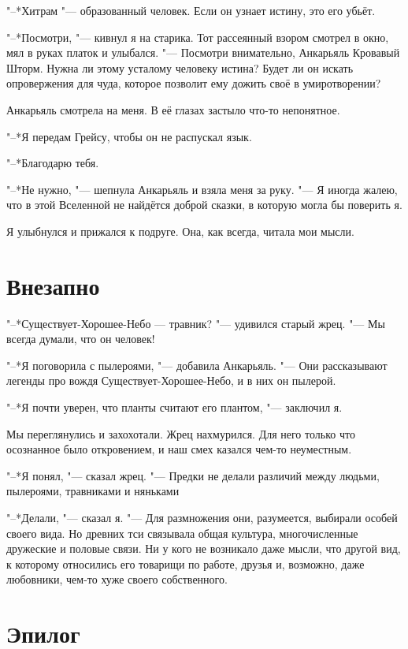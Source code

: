 "--*Хитрам "--- образованный человек.
Если он узнает истину, это его убьёт.

"--*Посмотри, "--- кивнул я на старика.
Тот рассеянный взором смотрел в окно, мял в руках платок и улыбался.
"--- Посмотри внимательно, Анкарьяль Кровавый Шторм.
Нужна ли этому усталому человеку истина?
Будет ли он искать опровержения для чуда, которое позволит ему дожить своё в умиротворении?

Анкарьяль смотрела на меня.
В её глазах застыло что-то непонятное.

"--*Я передам Грейсу, чтобы он не распускал язык.

"--*Благодарю тебя.

"--*Не нужно, "--- шепнула Анкарьяль и взяла меня за руку.
"--- Я иногда жалею, что в этой Вселенной не найдётся доброй сказки, в которую могла бы поверить я.

Я улыбнулся и прижался к подруге.
Она, как всегда, читала мои мысли.

\section{Внезапно}

"--*Существует-Хорошее-Небо — травник? "--- удивился старый жрец.
"--- Мы всегда думали, что он человек!

"--*Я поговорила с пылероями, "--- добавила Анкарьяль.
"--- Они рассказывают легенды про вождя Существует-Хорошее-Небо, и в них он пылерой.

"--*Я почти уверен, что планты считают его плантом, "--- заключил я.

Мы переглянулись и захохотали.
Жрец нахмурился.
Для него только что осознанное было откровением, и наш смех казался чем-то неуместным.

"--*Я понял, "--- сказал жрец.
"--- Предки не делали различий между людьми, пылероями, травниками и няньками\ldotst

"--*Делали, "--- сказал я.
"--- Для размножения они, разумеется, выбирали особей своего вида.
Но древних тси связывала общая культура, многочисленные дружеские и половые связи.
Ни у кого не возникало даже мысли, что другой вид, к которому относились его товарищи по работе, друзья и, возможно, даже любовники, чем-то хуже своего собственного.

\section{Эпилог}

